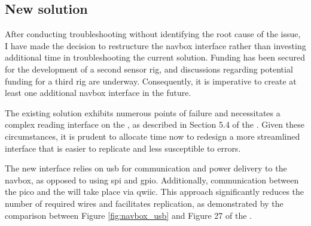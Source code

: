 \subsection{New solution}
After conducting troubleshooting without identifying the root cause of the issue, I have made the decision to restructure the \gls{navbox} interface rather than investing additional time in troubleshooting the current solution.
Funding has been secured for the development of a second sensor rig, and discussions regarding potential funding for a third rig are underway.
Consequently, it is imperative to create at least one additional \gls{navbox} interface in the future.

The existing solution exhibits numerous points of failure and necessitates a complex reading interface on the \jx, as described in Section 5.4 of the \preproject.
Given these circumstances, it is prudent to allocate time now to redesign a more streamlined interface that is easier to replicate and less susceptible to errors.

The new interface relies on \gls{usb} for communication and power delivery to the \gls{navbox}, as opposed to using \gls{spi} and \gls{gpio}.
Additionally, communication between the \gls{pico} and the  will take place via \gls{qwiic}.
This approach significantly reduces the number of required wires and facilitates replication, as demonstrated by the comparison between Figure \ref{fig:navbox_usb} and Figure 27 of the \preproject.


